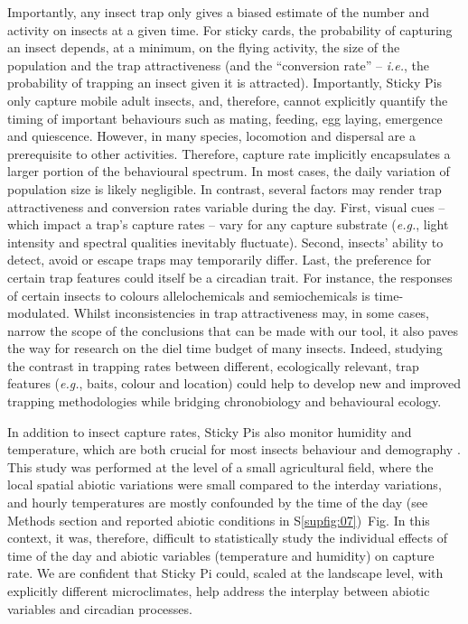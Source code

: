 \documentclass[12pt]{article}
\begin{document}
\begin{linenumbers}
				
		Importantly, any insect trap only gives a biased estimate of the number and activity on insects at a given time.
		For sticky cards, the probability of capturing an insect depends, at a minimum, on the flying activity, the size of the population and the trap attractiveness (and the ``conversion rate'' – \emph{i.e.}, the probability of trapping an insect given it is attracted). Importantly, Sticky Pis only capture mobile adult insects, and, therefore, cannot explicitly quantify the timing of important behaviours such as mating, feeding, egg laying, emergence and quiescence.
		However, in many species, locomotion and dispersal are a prerequisite to other activities.
		Therefore, capture rate implicitly encapsulates a larger portion of the behavioural spectrum.
		In most cases, the daily variation of population size is likely negligible. In contrast, several factors may render trap attractiveness and conversion rates variable during the day. First, visual cues – which impact a trap’s capture rates\cite{clare_pheromone_2000, sukovata_importance_2020} – vary for any capture substrate (\emph{e.g.}, light intensity and spectral qualities inevitably fluctuate).
		Second, insects' ability to detect, avoid or escape traps may temporarily differ. Last, the preference for certain trap features could itself be a circadian trait. For instance, the responses of certain insects to colours\cite{lazopulo_daytime_2019} allelochemicals\cite{barrozo_response_2004,eilerts_odor-specific_2018} and semiochemicals\cite{rosen_circadian_2003, schendzielorz_time_2012, zhukovskaya_circadian_1995} is time-modulated.
		Whilst inconsistencies in trap attractiveness may, in some cases, narrow the scope of the conclusions that can be made with our tool, it also paves the way for research on the diel time budget of many insects.
		Indeed, studying the contrast in trapping rates between different, ecologically relevant, trap features (\emph{e.g.}, baits, colour and location) could help to develop new and improved trapping methodologies while bridging chronobiology and behavioural ecology.
		
		In addition to insect capture rates, Sticky Pis also monitor humidity and temperature, which are both crucial for most insects behaviour and demography \cite{jaworski_effect_2013,pawson_predicting_2017}.
		This study was performed at the level of a small agricultural field, where the local spatial abiotic variations were small compared to the interday variations, and hourly temperatures are mostly confounded by the time of the day (see Methods section and reported abiotic conditions in S\ref{supfig:07})~Fig. 
		In this context, it was, therefore, difficult to statistically study the individual effects of time of the day and abiotic variables (temperature and humidity) on capture rate. 
		We are confident that Sticky Pi could, scaled at the landscape level, with explicitly different microclimates, help address the interplay between abiotic variables and circadian processes.
		

\end{linenumbers}
\end{document}
